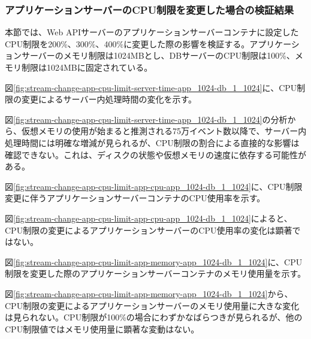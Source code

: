 \documentclass[../../../../main]{subfiles}
\begin{document}
    \subsubsection{アプリケーションサーバーのCPU制限を変更した場合の検証結果}\label{subsubsec:result-streaming-change-app-cpu}

    本節では、Web APIサーバーのアプリケーションサーバーコンテナに設定したCPU制限を200\%、300\%、400\%に変更した際の影響を検証する。アプリケーションサーバーのメモリ制限は1024MBとし、DBサーバーのCPU制限は100\%、メモリ制限は1024MBに固定されている。


    図\ref{fig:stream-change-app-cpu-limit-server-time-app_1024-db_1_1024}に、CPU制限の変更によるサーバー内処理時間の変化を示す。

    

    図\ref{fig:stream-change-app-cpu-limit-server-time-app_1024-db_1_1024}の分析から、仮想メモリの使用が始まると推測される75万イベント数以降で、サーバー内処理時間には明確な増減が見られるが、CPU制限の割合による直接的な影響は確認できない。これは、ディスクの状態や仮想メモリの速度に依存する可能性がある。


    図\ref{fig:stream-change-app-cpu-limit-app-cpu-app_1024-db_1_1024}に、CPU制限変更に伴うアプリケーションサーバーコンテナのCPU使用率を示す。

    

    図\ref{fig:stream-change-app-cpu-limit-app-cpu-app_1024-db_1_1024}によると、CPU制限の変更によるアプリケーションサーバーのCPU使用率の変化は顕著ではない。


    図\ref{fig:stream-change-app-cpu-limit-app-memory-app_1024-db_1_1024}に、CPU制限を変更した際のアプリケーションサーバーコンテナのメモリ使用量を示す。

    

    図\ref{fig:stream-change-app-cpu-limit-app-memory-app_1024-db_1_1024}から、CPU制限の変更によるアプリケーションサーバーのメモリ使用量に大きな変化は見られない。CPU制限が100\%の場合にわずかなばらつきが見られるが、他のCPU制限値ではメモリ使用量に顕著な変動はない。

\end{document}
